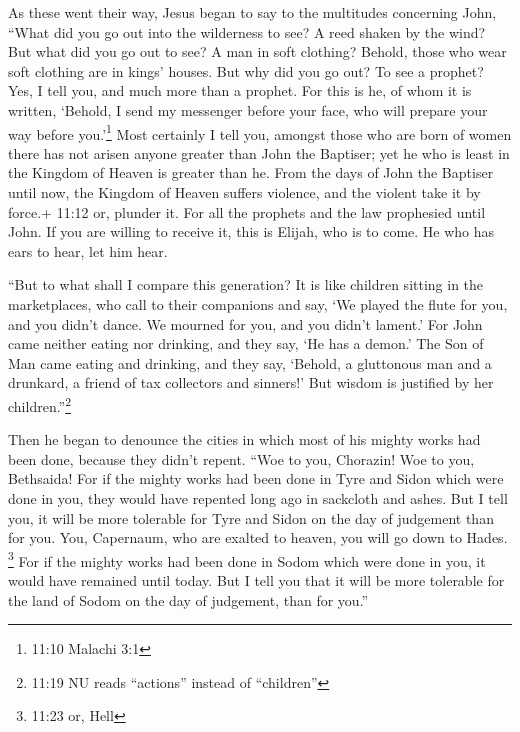  As these went their way, Jesus began to say to the
multitudes concerning John, ``What did you go out into the wilderness to
see? A reed shaken by the wind?  But what did you go out to
see? A man in soft clothing? Behold, those who wear soft clothing are in
kings' houses.  But why did you go out? To see a prophet?
Yes, I tell you, and much more than a prophet.  For this is
he, of whom it is written, `Behold, I send my messenger before your
face, who will prepare your way before you.'\footnote{11:10 Malachi 3:1}
 Most certainly I tell you, amongst those who are born of
women there has not arisen anyone greater than John the Baptiser; yet he
who is least in the Kingdom of Heaven is greater than he. 
From the days of John the Baptiser until now, the Kingdom of Heaven
suffers violence, and the violent take it by force.+ 11:12 or, plunder
it.  For all the prophets and the law prophesied until
John.  If you are willing to receive it, this is Elijah,
who is to come.  He who has ears to hear, let him hear.

 ``But to what shall I compare this generation? It is like
children sitting in the marketplaces, who call to their companions
 and say, `We played the flute for you, and you didn't
dance. We mourned for you, and you didn't lament.'  For
John came neither eating nor drinking, and they say, `He has a demon.'
 The Son of Man came eating and drinking, and they say,
`Behold, a gluttonous man and a drunkard, a friend of tax collectors and
sinners!' But wisdom is justified by her children.''\footnote{11:19 NU
  reads ``actions'' instead of ``children''}

 Then he began to denounce the cities in which most of his
mighty works had been done, because they didn't repent. 
``Woe to you, Chorazin! Woe to you, Bethsaida! For if the mighty works
had been done in Tyre and Sidon which were done in you, they would have
repented long ago in sackcloth and ashes.  But I tell you,
it will be more tolerable for Tyre and Sidon on the day of judgement
than for you.  You, Capernaum, who are exalted to heaven,
you will go down to Hades. \footnote{11:23 or, Hell} For if the mighty
works had been done in Sodom which were done in you, it would have
remained until today.  But I tell you that it will be more
tolerable for the land of Sodom on the day of judgement, than for you.''

